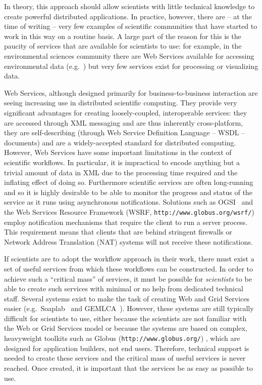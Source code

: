 \documentclass{article}
\begin{document}
In theory, this approach should allow scientists with little technical knowledge to create powerful distributed applications.  In practice, however, there are -- at the time of writing -- very few examples of scientific communities that have started to work in this way on a routine basis.  A large part of the reason for this is the paucity of services that are available for scientists to use: for example, in the environmental sciences community there are Web Services available for accessing environmental data (e.g.\ \cite{Woolf:2003}) but very few services exist for processing or visualizing data.

Web Services, although designed primarily for business-to-business interaction are seeing increasing use in distributed scientific computing.  They provide very significant advantages for creating loosely-coupled, interoperable services: they are accessed through XML messaging and are thus inherently cross-platform, they are self-describing (through Web Service Definition Language -- WSDL -- documents) and are a widely-accepted standard for distributed computing.  However, Web Services have some important limitations in the context of scientific workflows. In particular, it is impractical to encode anything but a trivial amount of data in XML due to the processing time required and the inflating effect of doing so. Furthermore scientific services are often long-running and so it is highly desirable to be able to monitor the progress and status of the service as it runs using asynchronous notifications. Solutions such as OGSI~\cite{ogsi} and the Web Services Resource Framework (WSRF, {\tt http://www.globus.org/wsrf/}) employ notification mechanisms that require the client to run a server process. This requirement means that clients that are behind stringent firewalls or Network Address Translation (NAT) systems will not receive these notifications.

If scientists are to adopt the workflow approach in their work, there must exist a set of useful services from which these workflows can be constructed.  In order to achieve such a ``critical mass'' of services, it must be possible for {\em scientists\/} to be able to create such services with minimal or no help from dedicated technical staff.  Several systems exist to make the task of creating Web and Grid Services easier (e.g.\ Soaplab~\cite{soaplab} and GEMLCA~\cite{gemlca}).  However, these systems are still typically difficult for scientists to use, either because the scientists are not familiar with the Web or Grid Services model or because the systems are based on complex, heavyweight toolkits such as Globus ({\tt http://www.globus.org/})%
, which are designed for application builders, not end users.  Therefore, technical support is needed to create these services and the critical mass of useful services is never reached.  Once created, it is important that the services be as easy as possible to use.
\end{document}

